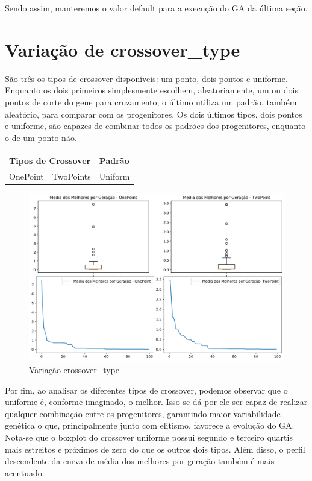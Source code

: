 \documentclass[12pt]{article}
\begin{document}
	Sendo assim, manteremos o valor default para a execução do GA da última seção.
	
	\section{Variação de crossover\_type}
	
	São três os tipos de crossover disponíveis: um ponto, dois pontos e uniforme. Enquanto os dois primeiros simplesmente escolhem, aleatoriamente, um ou dois pontos de corte do gene para cruzamento, o último utiliza um padrão, também aleatório, para comparar com os progenitores. Os dois últimos tipos, dois pontos e uniforme, são capazes de combinar todos os padrões dos progenitores, enquanto o de um ponto não.
	
	\begin{table}[H]
		\centering
		\begin{tabular}{|l|l|l|}
			\hline
			\multicolumn{2}{|l|}{Tipos de Crossover}&Padrão \\ \hline
			OnePoint    & TwoPoints    & Uniform    \\ \hline
		\end{tabular}
	\end{table}
	
	\begin{figure}[H]
		\centering
		\includegraphics[width=0.9\linewidth]{Imagens/TipoCross}
		\caption{Variação crossover\_type}
		\label{fig:tipocross}
	\end{figure}
	
	Por fim, ao analisar os diferentes tipos de crossover, podemos observar que o uniforme é, conforme imaginado, o melhor. Isso se dá por ele ser capaz de realizar qualquer combinação entre os progenitores, garantindo maior variabilidade genética o que, principalmente junto com elitismo, favorece a evolução do GA. Nota-se que o boxplot do crossover uniforme possui segundo e terceiro quartis mais estreitos e próximos de zero do que os outros dois tipos. Além disso, o perfil descendente da curva de média dos melhores por geração também é mais acentuado.
	
\end{document}
